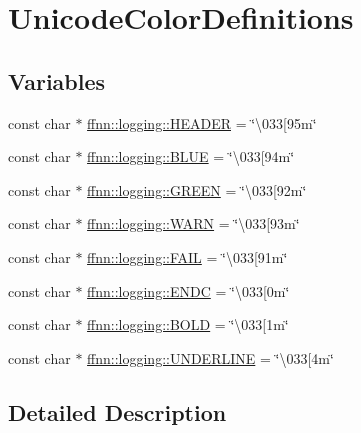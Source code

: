 \hypertarget{group___unicode_color_definitions}{\section{Unicode\-Color\-Definitions}
\label{group___unicode_color_definitions}
}
\subsection*{Variables}
\begin{DoxyCompactItemize}
\item 
const char $\ast$ \hyperlink{group___unicode_color_definitions_ga65590452b7707feb609f43a9ca306d42}{ffnn\-::logging\-::\-H\-E\-A\-D\-E\-R} = \char`\"{}\textbackslash{}033\mbox{[}95m\char`\"{}
\item 
const char $\ast$ \hyperlink{group___unicode_color_definitions_ga3e2c8118c023bd9d8bb394366f943cc5}{ffnn\-::logging\-::\-B\-L\-U\-E} = \char`\"{}\textbackslash{}033\mbox{[}94m\char`\"{}
\item 
const char $\ast$ \hyperlink{group___unicode_color_definitions_ga00119b4fa7f1c1e88aec7e09e2215298}{ffnn\-::logging\-::\-G\-R\-E\-E\-N} = \char`\"{}\textbackslash{}033\mbox{[}92m\char`\"{}
\item 
const char $\ast$ \hyperlink{group___unicode_color_definitions_gafc935a693ebe97569c82dd2415bb7373}{ffnn\-::logging\-::\-W\-A\-R\-N} = \char`\"{}\textbackslash{}033\mbox{[}93m\char`\"{}
\item 
const char $\ast$ \hyperlink{group___unicode_color_definitions_ga2047db0e31e0a45c7c213845567afc06}{ffnn\-::logging\-::\-F\-A\-I\-L} = \char`\"{}\textbackslash{}033\mbox{[}91m\char`\"{}
\item 
const char $\ast$ \hyperlink{group___unicode_color_definitions_gab21e47dcbc216f8fc7de88bd217f9f0a}{ffnn\-::logging\-::\-E\-N\-D\-C} = \char`\"{}\textbackslash{}033\mbox{[}0m\char`\"{}
\item 
const char $\ast$ \hyperlink{group___unicode_color_definitions_ga32fca3fc24af93ce9c4ca33b4a6a3dde}{ffnn\-::logging\-::\-B\-O\-L\-D} = \char`\"{}\textbackslash{}033\mbox{[}1m\char`\"{}
\item 
const char $\ast$ \hyperlink{group___unicode_color_definitions_gab2b4d719c3fe8672abf96e00a37c799c}{ffnn\-::logging\-::\-U\-N\-D\-E\-R\-L\-I\-N\-E} = \char`\"{}\textbackslash{}033\mbox{[}4m\char`\"{}
\end{DoxyCompactItemize}


\subsection{Detailed Description}


